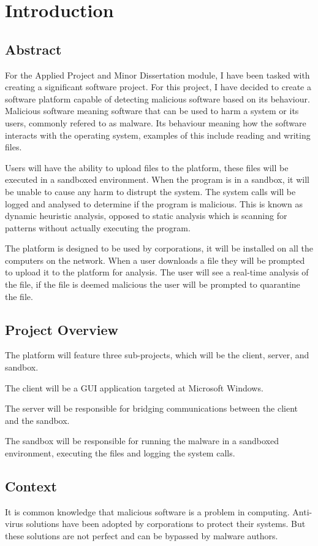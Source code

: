 \chapter{Introduction}

\section{Abstract}
For the Applied Project and Minor Dissertation module, I have been tasked with creating a significant software project.
For this project, I have decided to create a software platform capable of detecting malicious software based on its behaviour.
Malicious software meaning software that can be used to harm a system or its users, commonly refered to as malware.
Its behaviour meaning how the software interacts with the operating system, examples of this include reading and writing files.

Users will have the ability to upload files to the platform, these files will be executed in a sandboxed environment.
When the program is in a sandbox, it will be unable to cause any harm to distrupt the system.
The system calls will be logged and analysed to determine if the program is malicious.
This is known as dynamic heuristic analysis, opposed to static analysis which is scanning for patterns without actually executing the program.

The platform is designed to be used by corporations, it will be installed on all the computers on the network.
When a user downloads a file they will be prompted to upload it to the platform for analysis.
The user will see a real-time analysis of the file, if the file is deemed malicious the user will be prompted to quarantine the file.

\section{Project Overview}
The platform will feature three sub-projects, which will be the client, server, and sandbox.

The client will be a GUI application targeted at Microsoft Windows.

The server will be responsible for bridging communications between the client and the sandbox.

The sandbox will be responsible for running the malware in a sandboxed environment,
executing the files and logging the system calls.

\section{Context}
It is common knowledge that malicious software is a problem in computing.
Anti-virus solutions have been adopted by corporations to protect their systems.
But these solutions are not perfect and can be bypassed by malware authors.

